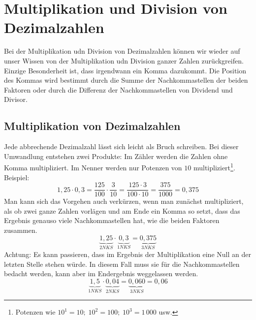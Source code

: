	\section{Multiplikation und Division von Dezimalzahlen}\vspace{-1em}
Bei der Multiplikation udn Division von Dezimalzahlen können wir wieder auf unser Wissen von der Multiplikation udn Division ganzer Zahlen zurückgreifen. Einzige Besonderheit ist, dass irgendwann ein Komma dazukommt. Die Position des Kommas wird bestimmt durch die Summe der Nachkommastellen der beiden Faktoren oder durch die Differenz der Nachkommastellen von Dividend und Divisor.

\subsection{Multiplikation von Dezimalzahlen}\vspace{-1em}
Jede abbrechende Dezimalzahl lässt sich leicht als Bruch schreiben. Bei dieser Umwandlung entstehen zwei Produkte: Im Zähler werden die Zahlen ohne Komma multipliziert. Im Nenner werden nur Potenzen von $10$ multipliziert\footnote{Potenzen wie $10^1=10;\; 10^2=100;\; 10^3=1\,000$ usw.}.
%
Beispiel:
\begin{equation*}
	1{,}25\cdot 0{,}3 = \frac{125}{100}\cdot\frac{3}{10}= \frac{125\cdot3}{100\cdot10}= \frac{375}{1000}=0{,}375
\end{equation*}
Man kann sich das Vorgehen auch verkürzen, wenn man zunächst multipliziert, als ob zwei ganze Zahlen vorlägen und am Ende ein Komma so setzt, dass das Ergebnis genauso viele Nachkommastellen hat, wie die beiden Faktoren zusammen.
\begin{equation*}
	\underbrace{1{,}25}_{2 NKS}\cdot \underbrace{0{,}3}_{1 NKS} = \underbrace{0{,}375}_{3 NKS}
\end{equation*}
%
Achtung: Es kann passieren, dass im Ergebnis der Multiplikation eine Null an der letzten Stelle stehen würde. In diesem Fall muss sie für die Nachkommastellen bedacht werden, kann aber im Endergebnis weggelassen werden.
\begin{equation*}
	\underbrace{1{,}5}_{1 NKS}\cdot \underbrace{0{,}04}_{2 NKS} = \underbrace{0{,}060}_{3NKS} = 0{,}06
\end{equation*}

